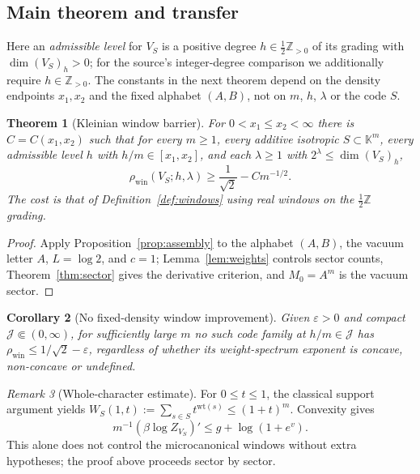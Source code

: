 \documentclass[10pt,a4paper]{article}
\numberwithin{equation}{section}
\newtheorem{theorem}{Theorem}[section]
\newtheorem{corollary}[theorem]{Corollary}
\theoremstyle{remark}\newtheorem{remark}[theorem]{Remark}\newtheorem{question}[theorem]{Question}
\newcommand{\rhow}{\rho_{\mathrm{win}}}\newcommand{\F}{\mathbb F}\newcommand{\K}{\mathbb K}\newcommand{\Z}{\mathbb Z}\newcommand{\R}{\mathbb R}\newcommand{\cB}{\mathcal L}\newcommand{\wt}{\mathrm{wt}}\newcommand{\dimn}{\operatorname{dim}}\newcommand{\supp}{\operatorname{supp}}
\begin{document}
\subsection{Main theorem and transfer}
Here an \emph{admissible level} for $V_S$ is a positive degree $h\in\frac12\Z_{>0}$ of its grading with $\dimn(V_S)_h>0$; for the source's integer-degree comparison we additionally require $h\in\Z_{>0}$. The constants in the next theorem depend on the density endpoints $x_1,x_2$ and the fixed alphabet $(A,B)$, not on $m$, $h$, $\lambda$ or the code $S$.
\begin{theorem}[Kleinian window barrier]\label{thm:main}
For $0<x_1\le x_2<\infty$ there is $C=C(x_1,x_2)$ such that for every $m\ge1$, every additive isotropic $S\subset\K^m$, every admissible level $h$ with $h/m\in[x_1,x_2]$, and each $\lambda\ge1$ with $2^\lambda\le\dimn(V_S)_h$,
\begin{equation}\label{eq:theoremC}
\boxed{\rhow(V_S;h,\lambda)\ge\frac1{\sqrt2}-Cm^{-1/2}.}
\end{equation}
The cost is that of Definition~\ref{def:windows} using real windows on the $\frac12\Z$ grading.
\end{theorem}
\begin{proof}Apply Proposition~\ref{prop:assembly} to the alphabet $(A,B)$, the vacuum letter $A$, $L=\log2$, and $c=1$; Lemma~\ref{lem:weights} controls sector counts, Theorem~\ref{thm:sector} gives the derivative criterion, and $M_0=A^m$ is the vacuum sector.\end{proof}
\begin{corollary}[No fixed-density window improvement]\label{cor:fixed}
Given $\varepsilon>0$ and compact $\mathcal J\Subset(0,\infty)$, for sufficiently large $m$ no such code family at $h/m\in \mathcal J$ has $\rhow\le1/\sqrt2-\varepsilon$, regardless of whether its weight-spectrum exponent is concave, non-concave or undefined.
\end{corollary}
\begin{remark}[Whole-character estimate]\label{rem:whole}
For $0\le t\le1$, the classical support argument yields $W_S(1,t):=\sum_{s\in S}t^{\wt(s)}\le(1+t)^m$. Convexity gives
\[m^{-1}(\beta\log Z_{V_S})'\le g+\log(1+e^v).\]
This alone does not control the microcanonical windows without extra hypotheses; the proof above proceeds sector by sector.\end{remark}
\end{document}
